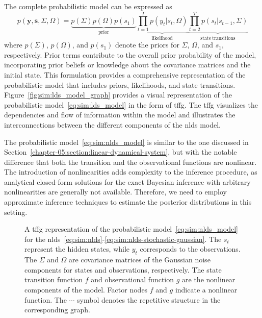 The complete probabilistic model can be expressed as
\begin{equation}
  \label{eq:sim:nlds_model} p(\bm{y}, \bm{s}, \Sigma, \Omega) =
  \underbrace{p(\Sigma)p(\Omega)p(s_1)}_{\mathrm{prior}}\underbrace{\prod_{t = 1}^{T} p(y_t\vert
    s_t, \Omega)}_{\mathrm{likelihood}}\underbrace{\prod_{t = 2}^{T}p(s_t\vert s_{t - 1},
    \Sigma)}_{\mathrm{state~transitions}}
\end{equation}
where $p(\Sigma)$, $p(\Omega)$, and
$p(s_1)$ denote the priors for $\Sigma$, $\Omega$, and $s_1$, respectively.
Prior terms contribute to the overall prior probability of the model, incorporating prior
beliefs or knowledge about the covariance matrices and the initial state.
This formulation provides a comprehensive representation of the probabilistic model that
includes priors, likelihoods, and state transitions.
Figure~\eqref{fig:sim:lds_model_graph} provides a visual representation of the probabilistic
model~\eqref{eq:sim:lds_model} in the form of \ac{tffg}.
The \ac{tffg} visualizes the dependencies and flow of information within the model and illustrates
the interconnections between the different components of the \ac{nlds} model.

The probabilistic model~\eqref{eq:sim:nlds_model} is similar to the one discussed in
Section~\ref{chapter-05:section:linear-dynamical-system}, but with the notable difference that
both the transition and the observational functions are nonlinear.
The introduction of nonlinearities adds complexity to the inference procedure, as analytical
closed-form solutions for the exact Bayesian inference with arbitrary nonlinearities are generally not
available.
Therefore, we need to employ approximate inference techniques to estimate the posterior
distributions in this setting.

\begin{figure}
  \centering
  \resizebox{\textwidth}{!}{}
  \caption{
    A \ac{tffg} representation of the probabilistic model~\eqref{eq:sim:nlds_model} for the \ac{nlds}~\eqref{eq:sim:nlds}-\eqref{eq:sim:nlds-stochastic-gaussian}.
    The $s_t$ represent the hidden states, while $y_t$ corresponds to the
    observations.
    The $\Sigma$ and $\Omega$ are covariance matrices of the Gaussian noise components for states
    and observations, respectively.
    The state transition function $f$ and observational function $g$ are the nonlinear components of the model.
    Factor nodes $f$ and $g$ indicate a nonlinear function.
    The $\cdots$ symbol denotes the repetitive structure in the corresponding graph.
  }
  \label{fig:sim:nlds_model_graph}
\end{figure}

